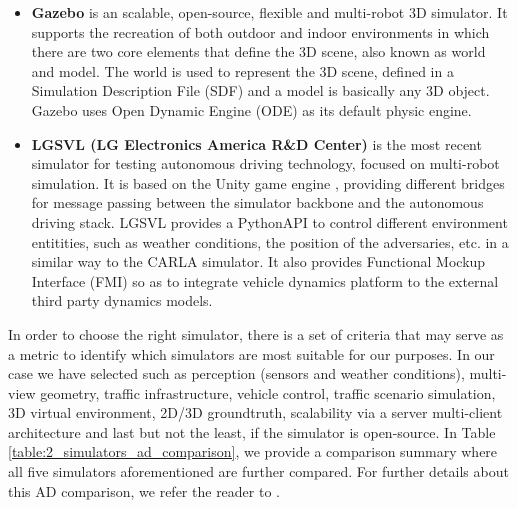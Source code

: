 \begin{itemize}
	\item \textbf{Gazebo} \cite{koenig2004design} is an scalable, open-source, flexible and multi-robot 3D simulator. It supports the recreation of both outdoor and indoor environments in which there are two core elements that define the 3D scene, also known as world and model. The world is used to represent the 3D scene, defined in a Simulation Description File (SDF) and a model is basically any 3D object. Gazebo uses Open Dynamic Engine (ODE) as its default physic engine.
	
	\item \textbf{LGSVL (LG Electronics America R\&D Center)} \cite{rong2020lgsvl} is the most recent simulator for testing autonomous driving technology, focused on multi-robot simulation. It is based on the Unity game engine \cite{haas2014history}, providing different bridges for message passing between the simulator backbone and the autonomous driving stack. LGSVL provides a PythonAPI to control different environment entitities, such as weather conditions, the position of the adversaries, etc. in a similar way to the \ac{CARLA} simulator. It also provides Functional Mockup Interface (FMI) so as to integrate vehicle dynamics platform to the external third party dynamics models.
	
\end{itemize}

In order to choose the right simulator, there is a set of criteria \cite{kaur2021survey} that may serve as a metric to identify which simulators are most suitable for our purposes. In our case we have selected such as perception (sensors and weather conditions), multi-view geometry, traffic infrastructure, vehicle control, traffic scenario simulation, 3D virtual environment, 2D/3D groundtruth, scalability via a server multi-client architecture and last but not the least, if the simulator is open-source. In Table \ref{table:2_simulators_ad_comparison}, we provide a comparison summary where all five simulators aforementioned are further compared. For further details about this \ac{AD} comparison, we refer the reader to \cite{kaur2021survey}.

